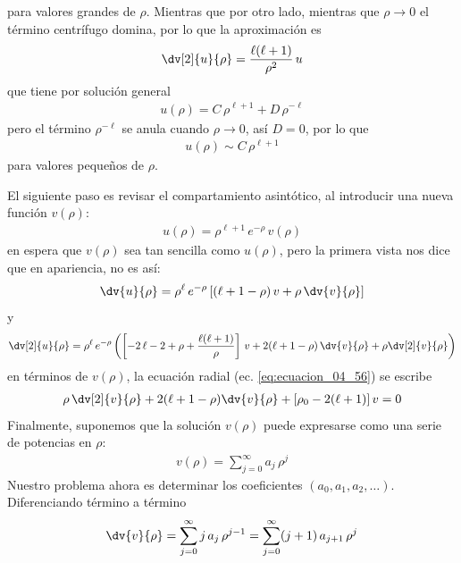 para valores grandes de $\rho$. Mientras que por otro lado, mientras que $\rho \to 0$ el término centrífugo domina, por lo que la aproximación es
\begin{align*}
\dv[2]{u}{\rho} = \dfrac{\ell (\ell + 1)}{\rho^{2}} \, u
\end{align*}
que tiene por solución general
\begin{align*}
u(\rho) = C \, \rho^{\ell +1} + D \, \rho^{-\ell}
\end{align*}
pero el término $\rho^{-\ell}$ se anula cuando $\rho \to 0$, así $D = 0$, por lo que
\begin{align}
u(\rho) \sim C \, \rho^{\ell + 1}
\label{eq:ecuacion_04_59}
\end{align}
para valores pequeños de $\rho$.
\par
El siguiente paso es revisar el compartamiento asintótico, al introducir una nueva función $v(\rho)$:
\begin{align}
u(\rho) = \rho^{\ell + 1} \, e^{-\rho} \, v(\rho)
\label{eq:ecuacion_04_60} 
\end{align}
en espera que $v(\rho)$ sea tan sencilla como $u(\rho)$, pero la primera vista nos dice que en apariencia, no es así:
\begin{align*}
\dv{u}{\rho} = \rho^{\ell} \, e^{-\rho} \left[ (\ell + 1 - \rho) \, v + \rho \, \dv{v}{\rho} \right]
\end{align*}
y
\begin{align*}
\dv[2]{u}{\rho} = \rho^{\ell} \, e^{-\rho} \left( \left[ -2 \, \ell - 2 + \rho + \dfrac{ \ell (\ell + 1)}{\rho} \right] \, v + 2 (\ell + 1 - \rho) \, \dv{v}{\rho} + \rho \dv[2]{v}{\rho} \right)
\end{align*}
en términos de $v(\rho)$, la ecuación radial (ec. \ref{eq:ecuacion_04_56}) se escribe
\begin{align}
\rho \, \dv[2]{v}{\rho} + 2 (\ell + 1 - \rho) \dv{v}{\rho} + [\rho_{0} - 2 (\ell + 1)] \, v = 0
\label{eq:ecuacion_04_61}
\end{align}
Finalmente, suponemos que la solución $v(\rho)$ puede expresarse como una serie de potencias en $\rho$:
\begin{align}
v(\rho) = \sum_{j=0}^{\infty} a_{j} \, \rho^{j} 
\label{eq:ecuacion_04_62}
\end{align}
Nuestro problema ahora es determinar los coeficientes $(a_{0}, a_{1}, a_{2}, \ldots)$. Diferenciando término a término
\begin{align*}
\dv{v}{\rho} = \sum_{j=0}^{\infty} j \, a_{j} \, \rho^{j - 1} = \sum_{j=0}^{\infty} (j + 1) \, a_{j+1} \, \rho^{j}
\end{align*}
